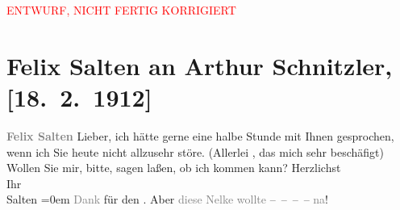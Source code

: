 
\begin{center}
            \textcolor{red}{ENTWURF, NICHT FERTIG KORRIGIERT}
                      \end{center}
            
         \renewcommand{\erwaehnteInstitutionen}{Institutionen: Bauernfeld-Preis}
         \renewcommand{\erwaehnteOrte}{Orte: Wien}
         \renewcommand{\erwaehnteWerke}{}
               \section[Felix Salten an Arthur Schnitzler, {[}18. 2. 1912{]}]{ Felix Salten an Arthur Schnitzler, {[}18. 2. 1912{]}}\nopagebreak{}\rehead{ }\begin{ledgroupsized}[t]{13cm}\normalsize\beginnumbering \toendnotes[C]{\smallbreak\pagebreak[2]} 
\toendnotes[C]{\smallbreak}\pstart
           \noindent{}\centering{}{\pb}\textcolor{gray}{\textbf{\textcolor{gray}{\textbf{Felix Salten}}}}\pend
           \pstart
           Lieber, ich hätte gerne eine halbe Stunde mit Ihnen gesprochen, wenn
               ich Sie heute nicht allzusehr störe. (Allerlei \label{K_L03556-1v}\label{K_L03556-1h}, das
               mich sehr beschäfigt) Wollen Sie mir, bitte, sagen laßen, ob ich kommen kann?\pend
           \pstart
           Herzlichst{\\[\baselineskip]} Ihr {\\[\baselineskip]}\spacefill\mbox{Salten}\pend
           \leftskip=0em{}\pstart
           \noindent{}\textcolor{gray}{Dank} für den \label{K_L03556-12v}\label{K_L03556-12h}.
                  Aber \textcolor{gray}{diese Nelke wollte} – – – –
                     \textcolor{gray}{na}!\pend
           
         
         \endnumbering{}\end{ledgroupsized}\begin{anhang}\end{anhang}\newcommand{\dateiname}{L03556}\newcommand{\titel}{Felix Salten an Arthur Schnitzler, [18. 2. 1912]}\newcommand{\editorInnen}{Martin Anton Müller und Laura Untner}
      